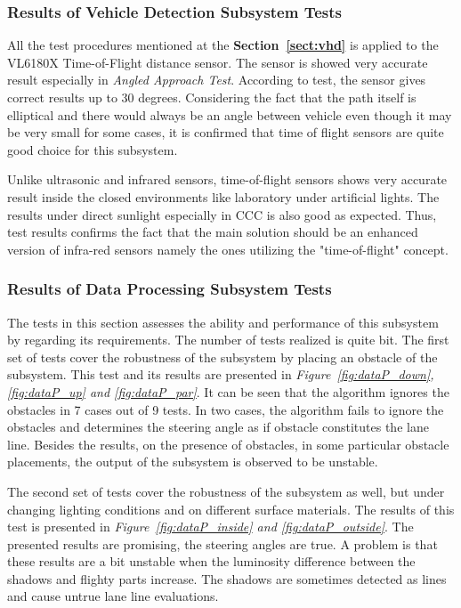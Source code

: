\documentclass[a4paper,12pt]{article}
\begin{document}
\subsubsection*{Results of Vehicle Detection Subsystem Tests}



All the test procedures mentioned at the \textbf{Section~\ref{sect:vhd}} is applied to the VL6180X Time-of-Flight distance sensor. The sensor is showed very accurate result especially in \textit{Angled Approach Test}. According to test, the sensor gives correct results up to 30 degrees. Considering the fact that the path itself is elliptical and there would always be an angle between vehicle even though it may be very small for some cases, it is confirmed that time of flight sensors are quite good choice for this subsystem.


Unlike ultrasonic and infrared sensors, time-of-flight sensors shows very accurate result inside the closed environments like laboratory under artificial lights. The results under direct sunlight especially in CCC is also good as expected.  Thus, test results confirms the fact that the main solution should be an enhanced version of infra-red sensors namely the ones utilizing the "time-of-flight" concept. 










\subsubsection*{Results of Data Processing Subsystem Tests}\label{sec:DataProcessingSubsystemTests}

The tests in this section assesses the ability and performance of this subsystem by regarding its requirements. The number of tests realized is quite  bit. The first set of tests cover the robustness of the subsystem by placing an obstacle of the subsystem. This test and its results are presented in \textit{Figure~\ref{fig:dataP_down},\ref{fig:dataP_up} and \ref{fig:dataP_par}}. It can be seen that the algorithm ignores the obstacles in 7 cases out of 9 tests. In two cases, the algorithm fails to ignore the obstacles and determines the steering angle as if obstacle constitutes the lane line. Besides the results, on the presence of obstacles, in some particular obstacle placements, the output of the subsystem is observed to be unstable.


The second set of tests cover the robustness of the subsystem as well, but under changing lighting conditions and on different surface materials. The results of this test is presented in \textit{Figure~\ref{fig:dataP_inside} and \ref{fig:dataP_outside}}. The presented results are promising, the steering angles are true. A problem is that these results are a bit unstable when the luminosity difference between the shadows and flighty parts increase. The shadows are sometimes detected as lines and cause untrue lane line evaluations.	
\end{document}
